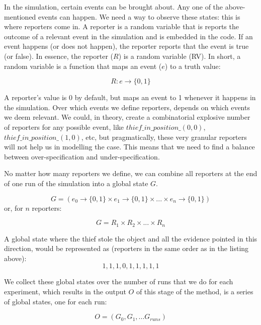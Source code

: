 \documentclass[11pt]{article}
\begin{document}
In the simulation, certain events can be brought about. Any one of the above-mentioned events can happen. We need a way to observe these states: this is where reporters come in. A reporter is a random variable that is reports the outcome of a relevant event in the simulation and is embedded in the code. If an event happens (or does not happen), the reporter reports that the event is true (or false). In essence, the reporter ($R$) is a random variable (RV). In short, a random variable is a function that maps an event ($e$) to a truth value:

\[ R : e \rightarrow \{0, 1\} \]

A reporter's value is 0 by default, but maps an event to 1 whenever it happens in the simulation. Over which events we define reporters, depends on which events we deem relevant. We could, in theory, create a combinatorial explosive number of reporters for any possible event, like $thief\_in\_position\_(0, 0)$, $thief\_in\_position\_(1, 0)$, etc, but pragmatically, these very granular reporters will not help us in modelling the case. This means that we need to find a balance between over-specification and under-specification.


No matter how many reporters we define, we can combine all reporters at the end of one run of the simulation into a global state $G$.

\[ G = (e_0 \rightarrow \{0, 1\} \times e_1 \rightarrow \{0, 1\} \times ... \times e_n \rightarrow \{0, 1\})\]
 or, for $n$ reporters:
 
\[ G = R_1 \times R_2 \times... \times R_n\]


A global state where the thief stole the object and all the evidence pointed in this direction, would be represented as (reporters in the same order as in the listing above):
 \[1,1,1,0,1,1,1,1,1\]


We collect these global states over the number of runs that we do for each experiment, which results in the output $O$ of this stage of the method, is a series of global states, one for each run:

\[ O = (G_0, G_1, ... G_{runs})\]
\end{document}
